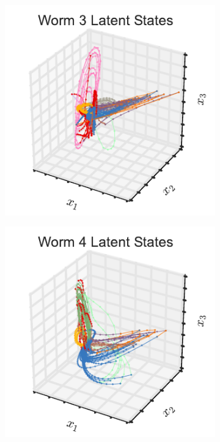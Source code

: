 \documentclass{article}
\begin{document}
\begin{figure}[t]
\begin{subfigure}[b]{0.32\linewidth}
  \end{subfigure}
  \\
  \begin{subfigure}[b]{0.32\linewidth}
    \includegraphics[width=\textwidth]{xs_3d_worm2.pdf}
  \end{subfigure}
  \begin{subfigure}[b]{0.32\linewidth}
    \includegraphics[width=\textwidth]{xs_3d_worm3.pdf}

\end{subfigure}
\end{figure}
\end{document}
